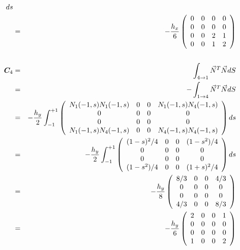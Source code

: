 \begin{eqnarray}
ds \nonumber\\
&=&
-\frac{h_x}{6}
\left(\begin{array}{cccc}
0 & 0 & 0 & 0 \\
0 & 0 & 0 & 0 \\
0 & 0 & 2 & 1 \\
0 & 0 & 1 & 2 
\end{array}\right)
\nonumber\\
\nonumber\\
{\bm C}_{4} 
&=& \int_{4\rightarrow 1} \vec{N}^T \vec{N} dS  \nonumber\\
&=& -\int_{1\rightarrow 4} \vec{N}^T \vec{N} dS  \nonumber\\
&=& 
-\frac{h_y}{2}
\int_{-1}^{+1}  
\left(\begin{array}{cccc}
N_1(-1,s)N_1(-1,s) & 0 & 0 & N_1(-1,s) N_4(-1,s) \\
0 & 0 & 0 & 0 \\
0 & 0 & 0 & 0 \\
N_1(-1,s)N_4(-1,s) & 0 & 0 & N_4(-1,s) N_4(-1,s)
\end{array}\right)
ds \nonumber\\
&=& 
-\frac{h_y}{2}
\int_{-1}^{+1}  
\left(\begin{array}{cccc}
(1-s)^2/4 &0 & 0 & (1-s^2)/4 \\
0 & 0 & 0 & 0 \\
0 & 0 & 0 & 0 \\
(1-s^2)/4 & 0 & 0 & (1+s)^2/4 
\end{array}\right)
ds \nonumber\\
&=&
-\frac{h_y}{8}
\left(\begin{array}{cccc}
8/3 & 0 & 0 & 4/3 \\
0 & 0 & 0 & 0 \\
0 & 0 & 0 & 0 \\
4/3& 0 & 0 & 8/3 
\end{array}\right)
\nonumber\\
&=&
-\frac{h_y}{6}
\left(\begin{array}{cccc}
2 & 0 & 0 & 1 \\
0 & 0 & 0 & 0 \\
0 & 0 & 0 & 0 \\
1& 0 & 0 & 2 
\end{array}\right)
\nonumber
\end{eqnarray}

